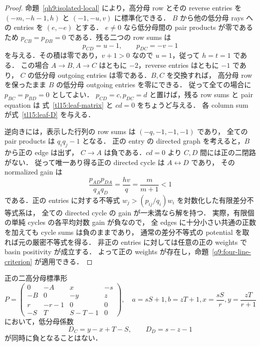 \begin{proof}
命題~\ref{qh9:isolated-local} により，高分母 row とその reverse entries を
$(-m,-h-1,h)$ と $(-1,-u,v)$ に標準化できる．
$B$ から他の低分母 rays への entries を $(e,-e)$ とする．
$e\ne0$ なら低分母間の pair products が零であるため
$p_{CB}=p_{DB}=0$ である．残る二つの row sums は
\[
 p_{CD}=u-1,\qquad p_{DC}=-v-1
\]
を与える．その積は零であり，$v+1>0$ なので $u=1$，従って $h=t=1$ である．
この場合 $A\to B,A\to C$ はともに $-2$，reverse entries はともに $-1$ であり，
$C$ の低分母 outgoing entries は零である．$B,C$ を交換すれば，
高分母 row を保ったまま $B$ の低分母 outgoing entries を零にできる．
従って全ての場合に $p_{BC}=p_{BD}=0$ としてよい．
$p_{CD}=c,p_{DC}=d$ と置けば，残る row sums と pair equation は
式~\eqref{tl15:leaf-matrix} と $cd=0$ をちょうど与える．
各 column sum が式~\eqref{tl15:leaf-D} を与える．

逆向きには，表示した行列の row sums は $(-q,-1,-1,-1)$ であり，
全ての pair products は $q_iq_j-1$ となる．
正の entry の directed graph を考えると，$B$ から正の edge は出ず，
$C\to A$ は負である．$cd=0$ より $C,D$ 間には正の二閉路がない．
従って唯一あり得る正の directed cycle は $A\leftrightarrow D$ であり，
その normalized gain は
\[
 \frac{p_{AD}p_{DA}}{q_Aq_D}=\frac{hv}{q}=\frac{m}{m+1}<1
\]
である．正の entries に対する不等式
$w_j>(p_{ij}/q_i)w_i$ を対数化した有限差分不等式系は，
全ての directed cycle の gain が一未満なら解を持つ．
実際，有限個の単純 cycles の各平均対数 gain が負なので，
全 edges に十分小さい共通の正数を加えても cycle sums は負のままであり，
通常の差分不等式の potential を取れば元の厳密不等式を得る．
非正の entries に対しては任意の正の weights で basin positivity が成立する．
よって正の weights が存在し，命題~\ref{q9:four-line-criterion} が適用できる．
\end{proof}

\begin{lemma}
\label{tl15:low-D}
正の二高分母標準形
\[
 P=\begin{pmatrix}
 0&-A&x&-s\\
 -B&0&-y&z\\
 r&-r-1&0&0\\
 -S&T&S-T-1&0
 \end{pmatrix},\quad
 a=sS+1, b=zT+1, x=\frac{sS}{r}, y=\frac{zT}{r+1}
\]
において，低分母係数
\begin{equation}\label{tl15:low-D-formula}
 D_C=y-x+T-S,\qquad D_D=s-z-1
\end{equation}
が同時に負となることはない．
\end{lemma}

